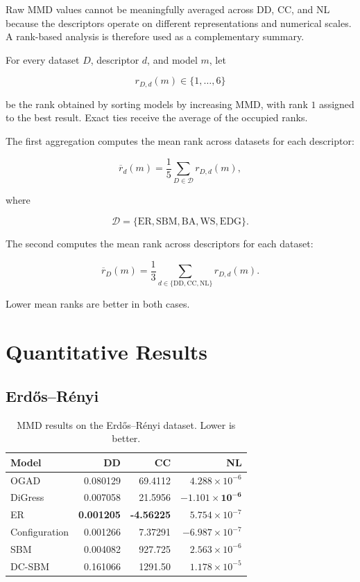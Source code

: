 Raw MMD values cannot be meaningfully averaged across DD, CC, and NL because the descriptors operate on different representations and numerical scales. A rank-based analysis is therefore used as a complementary summary.

For every dataset \(D\), descriptor \(d\), and model \(m\), let

\[
r_{D,d}(m)\in\{1,\ldots,6\}
\]

be the rank obtained by sorting models by increasing MMD, with rank \(1\) assigned to the best result. Exact ties receive the average of the occupied ranks.

The first aggregation computes the mean rank across datasets for each descriptor:

\[
\overline{r}_{d}(m)
=
\frac{1}{5}
\sum_{D\in\mathcal{D}}
r_{D,d}(m),
\]

where

\[
\mathcal{D}
=
\{
\mathrm{ER},
\mathrm{SBM},
\mathrm{BA},
\mathrm{WS},
\mathrm{EDG}
\}.
\]

The second computes the mean rank across descriptors for each dataset:

\[
\overline{r}_{D}(m)
=
\frac{1}{3}
\sum_{d\in\{\mathrm{DD},\mathrm{CC},\mathrm{NL}\}}
r_{D,d}(m).
\]

Lower mean ranks are better in both cases.


\section{Quantitative Results}
\label{sec:exp_results}

\subsection{Erd\H{o}s--R\'enyi}
\label{subsec:exp_er}

\begin{table}[htbp]
    \centering
    \caption{MMD results on the Erd\H{o}s--R\'enyi dataset. Lower is better.}
    \label{tab:exp_er}
    \begin{tabular}{lrrr}
        \hline
        Model & DD & CC & NL \\
        \hline
        OGAD          & 0.080129 & 69.4112   & \(4.288\times10^{-6}\) \\
        DiGress       & 0.007058 & 21.5956   & \(\mathbf{-1.101\times10^{-6}}\) \\
        ER            & \textbf{0.001205} & \textbf{-4.56225} & \(5.754\times10^{-7}\) \\
        Configuration & 0.001266 & 7.37291   & \(-6.987\times10^{-7}\) \\
        SBM           & 0.004082 & 927.725   & \(2.563\times10^{-6}\) \\
        DC-SBM  & 0.161066 & 1291.50   & \(1.178\times10^{-5}\) \\
        \hline
    \end{tabular}
\end{table}

